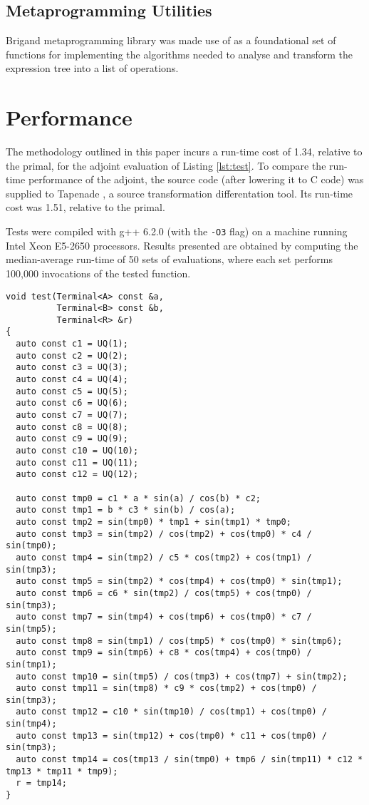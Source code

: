\documentclass[a4paper,10pt]{article}
\begin{document}
\subsection{Metaprogramming Utilities}
Brigand metaprogramming library was made use of as a foundational set of functions for implementing the algorithms needed to analyse and transform the expression tree into a list of operations.

\section{Performance}
The methodology outlined in this paper incurs a run-time cost of 1.34, relative to the primal, for the adjoint evaluation of Listing \ref{lst:test}. To compare the run-time performance of the adjoint, the source code (after lowering it to {C} code) was supplied to Tapenade \citep{TapenadeRef13}, a source transformation differentation tool. Its run-time cost was 1.51, relative to the primal.

Tests were compiled with g++ 6.2.0 (with the \texttt{-O3} flag) on a machine running Intel Xeon E5-2650 processors. Results presented are obtained by computing the median-average run-time of 50 sets of evaluations, where each set performs 100,000 invocations of the tested function.

\begin{lstlisting}[caption={The test function, making much use of transcendental functions}, label=lst:test]
void test(Terminal<A> const &a,
          Terminal<B> const &b,
          Terminal<R> &r)
{
  auto const c1 = UQ(1);
  auto const c2 = UQ(2);
  auto const c3 = UQ(3);
  auto const c4 = UQ(4);
  auto const c5 = UQ(5);
  auto const c6 = UQ(6);
  auto const c7 = UQ(7);
  auto const c8 = UQ(8);
  auto const c9 = UQ(9);
  auto const c10 = UQ(10);
  auto const c11 = UQ(11);
  auto const c12 = UQ(12);

  auto const tmp0 = c1 * a * sin(a) / cos(b) * c2;
  auto const tmp1 = b * c3 * sin(b) / cos(a);
  auto const tmp2 = sin(tmp0) * tmp1 + sin(tmp1) * tmp0;
  auto const tmp3 = sin(tmp2) / cos(tmp2) + cos(tmp0) * c4 / sin(tmp0);
  auto const tmp4 = sin(tmp2) / c5 * cos(tmp2) + cos(tmp1) / sin(tmp3);
  auto const tmp5 = sin(tmp2) * cos(tmp4) + cos(tmp0) * sin(tmp1);
  auto const tmp6 = c6 * sin(tmp2) / cos(tmp5) + cos(tmp0) / sin(tmp3);
  auto const tmp7 = sin(tmp4) + cos(tmp6) + cos(tmp0) * c7 / sin(tmp5);
  auto const tmp8 = sin(tmp1) / cos(tmp5) * cos(tmp0) * sin(tmp6);
  auto const tmp9 = sin(tmp6) + c8 * cos(tmp4) + cos(tmp0) / sin(tmp1);
  auto const tmp10 = sin(tmp5) / cos(tmp3) + cos(tmp7) + sin(tmp2);
  auto const tmp11 = sin(tmp8) * c9 * cos(tmp2) + cos(tmp0) / sin(tmp3);
  auto const tmp12 = c10 * sin(tmp10) / cos(tmp1) + cos(tmp0) / sin(tmp4);
  auto const tmp13 = sin(tmp12) + cos(tmp0) * c11 + cos(tmp0) / sin(tmp3);
  auto const tmp14 = cos(tmp13 / sin(tmp0) + tmp6 / sin(tmp11) * c12 * tmp13 * tmp11 * tmp9);
  r = tmp14;
}
\end{lstlisting}
\end{document}
